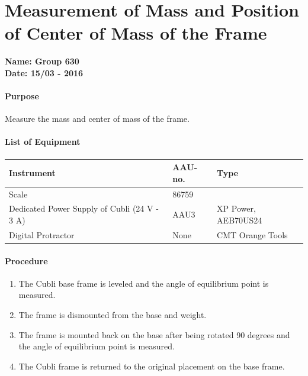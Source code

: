 \chapter{Measurement of Mass and Position of Center of Mass of the Frame }\label{app:MassFrameCenterOfMass} 
\textbf{Name: Group 630}\\
\textbf{Date: 15/03 - 2016}

\subsubsection{Purpose}
Measure the mass and center of mass of the frame.

\subsubsection{List of Equipment}
\begin{table}[H]
	\begin{tabular}{|l|l|p{4.3cm}|}
		\hline%
		\textbf{Instrument}                                  &  \textbf{AAU-no.}  &  \textbf{Type}                       \\
		\hline%
		Scale                                           & 86759            &  		                   \\
		\hline%
		Dedicated Power Supply of Cubli \small{(24 V - 3 A)} &  AAU3                   &  XP Power, AEB70US24                 \\
		\hline%
		Digital Protractor                                   &  None               & CMT Orange Tools     \\
		\hline%
	\end{tabular}
\end{table}
\subsubsection{Procedure}
\begin{enumerate}
	\item The Cubli base frame is leveled and the angle of equilibrium point is measured.
	\item The frame is dismounted from the base and weight.
	\item The frame is mounted back on the base after being rotated 90 degrees and the angle of equilibrium point is measured.
	\item The Cubli frame is returned to the original placement on the base frame.
\end{enumerate}


